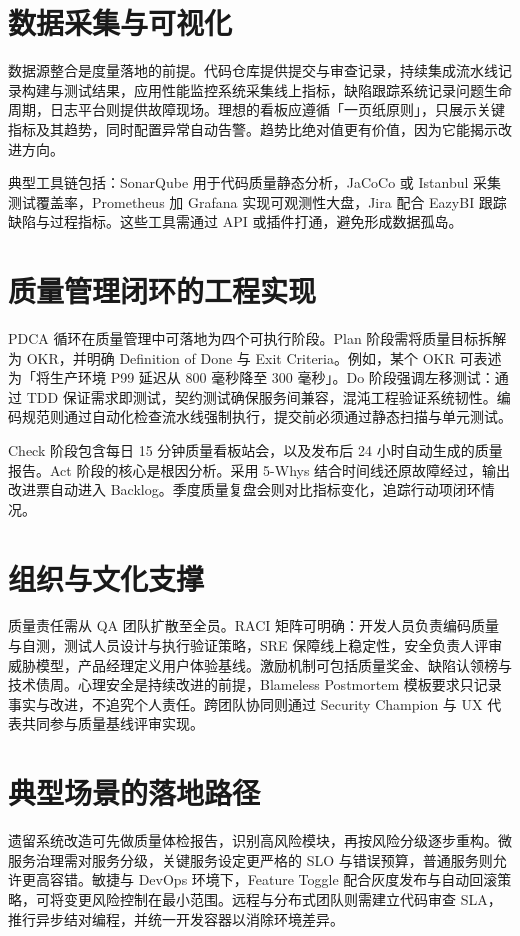 \chapter{数据采集与可视化}
数据源整合是度量落地的前提。代码仓库提供提交与审查记录，持续集成流水线记录构建与测试结果，应用性能监控系统采集线上指标，缺陷跟踪系统记录问题生命周期，日志平台则提供故障现场。理想的看板应遵循「一页纸原则」，只展示关键指标及其趋势，同时配置异常自动告警。趋势比绝对值更有价值，因为它能揭示改进方向。\par
典型工具链包括：SonarQube 用于代码质量静态分析，JaCoCo 或 Istanbul 采集测试覆盖率，Prometheus 加 Grafana 实现可观测性大盘，Jira 配合 EazyBI 跟踪缺陷与过程指标。这些工具需通过 API 或插件打通，避免形成数据孤岛。\par
\chapter{质量管理闭环的工程实现}
PDCA 循环在质量管理中可落地为四个可执行阶段。Plan 阶段需将质量目标拆解为 OKR，并明确 Definition of Done 与 Exit Criteria。例如，某个 OKR 可表述为「将生产环境 P99 延迟从 800 毫秒降至 300 毫秒」。Do 阶段强调左移测试：通过 TDD 保证需求即测试，契约测试确保服务间兼容，混沌工程验证系统韧性。编码规范则通过自动化检查流水线强制执行，提交前必须通过静态扫描与单元测试。\par
Check 阶段包含每日 15 分钟质量看板站会，以及发布后 24 小时自动生成的质量报告。Act 阶段的核心是根因分析。采用 5-Whys 结合时间线还原故障经过，输出改进票自动进入 Backlog。季度质量复盘会则对比指标变化，追踪行动项闭环情况。\par
\chapter{组织与文化支撑}
质量责任需从 QA 团队扩散至全员。RACI 矩阵可明确：开发人员负责编码质量与自测，测试人员设计与执行验证策略，SRE 保障线上稳定性，安全负责人评审威胁模型，产品经理定义用户体验基线。激励机制可包括质量奖金、缺陷认领榜与技术债周。心理安全是持续改进的前提，Blameless Postmortem 模板要求只记录事实与改进，不追究个人责任。跨团队协同则通过 Security Champion 与 UX 代表共同参与质量基线评审实现。\par
\chapter{典型场景的落地路径}
遗留系统改造可先做质量体检报告，识别高风险模块，再按风险分级逐步重构。微服务治理需对服务分级，关键服务设定更严格的 SLO 与错误预算，普通服务则允许更高容错。敏捷与 DevOps 环境下，Feature Toggle 配合灰度发布与自动回滚策略，可将变更风险控制在最小范围。远程与分布式团队则需建立代码审查 SLA，推行异步结对编程，并统一开发容器以消除环境差异。\par
